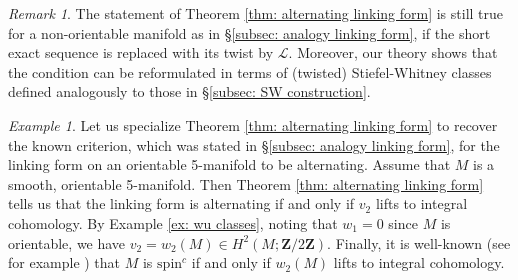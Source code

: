 \documentclass[10pt, reqno]{amsart}
\numberwithin{equation}{subsection}
\newcommand{\Z}{\mathbf{Z}}
\newcommand{\Cal}[1]{\mathcal{#1}}
\newcommand{\mrm}[1]{\mathrm{#1}}
\theoremstyle{remark}
\newtheorem{remark}[thm]{Remark}
\newtheorem{example}[thm]{Example}
\begin{document}
\begin{remark}
The statement of Theorem \ref{thm: alternating linking form} is still true for a non-orientable manifold as in \S \ref{subsec: analogy linking form}, if the short exact sequence is replaced with its twist by $\Cal{L}$. Moreover, our theory shows that the condition can be reformulated in terms of (twisted) Stiefel-Whitney classes defined analogously to those in  \S \ref{subsec: SW construction}.	
\end{remark}

\begin{example}
Let us specialize  Theorem \ref{thm: alternating linking form} to recover the known criterion, which was stated in \S \ref{subsec: analogy linking form}, for the linking form on an orientable 5-manifold to be alternating. Assume that $M$ is a smooth, orientable 5-manifold. Then Theorem \ref{thm: alternating linking form} tells us that the linking form is alternating if and only if $v_2$ lifts to integral cohomology. By Example \ref{ex: wu classes}, noting that $w_1 = 0$ since $M$ is orientable, we have $v_2 = w_2(M) \in H^2(M ; \Z/2\Z)$. Finally, it is well-known (see for example \cite[Theorem D.2]{LM}) that $M$ is $\mrm{spin}^{c}$ if and only if $w_2(M)$ lifts to integral cohomology. 
\end{example}


\appendix 







\end{document}
